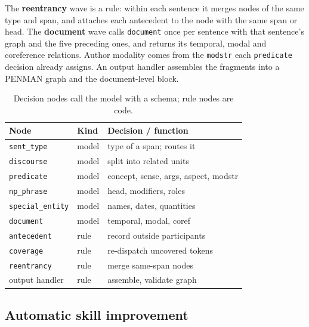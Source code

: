 \documentclass[11pt]{article}
\newcommand{\skill}[1]{\texttt{#1}}
\begin{document}
The \textbf{reentrancy} wave is a rule: within each sentence it merges nodes of the same type and span, and attaches each antecedent to the node with the same span or head. The \textbf{document} wave calls \skill{document} once per sentence with that sentence's graph and the five preceding ones, and returns its temporal, modal and coreference relations. Author modality comes from the \texttt{modstr} each \skill{predicate} decision already assigns. An output handler assembles the fragments into a PENMAN graph and the document-level block.

\begin{table}[t]
\centering\small
\setlength{\tabcolsep}{4pt}
\begin{tabular}{@{}llp{3.6cm}@{}}
\toprule
Node & Kind & Decision / function \\
\midrule
\skill{sent\_type} & model & type of a span; routes it \\
\skill{discourse} & model & split into related units \\
\skill{predicate} & model & concept, sense, args, aspect, modstr \\
\skill{np\_phrase} & model & head, modifiers, roles \\
\skill{special\_entity} & model & names, dates, quantities \\
\skill{document} & model & temporal, modal, coref \\
\midrule
\skill{antecedent} & rule & record outside participants \\
\skill{coverage} & rule & re-dispatch uncovered tokens \\
\skill{reentrancy} & rule & merge same-span nodes \\
output handler & rule & assemble, validate graph \\
\bottomrule
\end{tabular}
\caption{Decision nodes call the model with a schema; rule nodes are code.}
\label{tab:nodes}
\end{table}

\subsection{Automatic skill improvement}
\label{sec:rsi}
\end{document}
